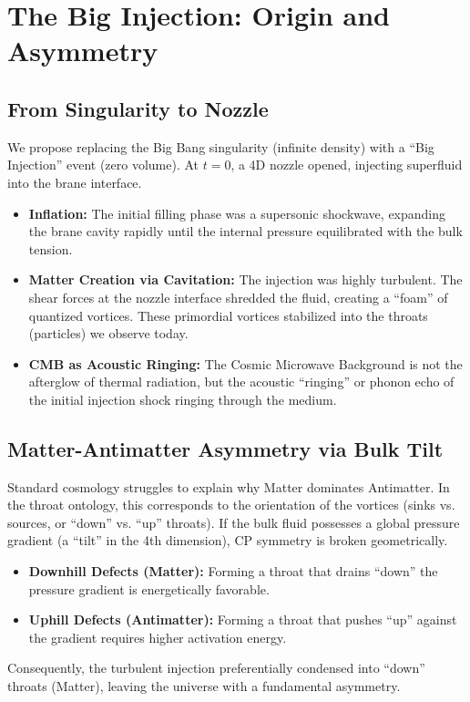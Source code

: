 \documentclass[12pt]{article}
\begin{document}
\section{The Big Injection: Origin and Asymmetry}
\label{sec:origin}

\subsection{From Singularity to Nozzle}
We propose replacing the Big Bang singularity (infinite density) with a ``Big Injection'' event (zero volume).
At $t=0$, a 4D nozzle opened, injecting superfluid into the brane interface.
\begin{itemize}
    \item \textbf{Inflation:} The initial filling phase was a supersonic shockwave, expanding the brane cavity rapidly until the internal pressure equilibrated with the bulk tension.
    \item \textbf{Matter Creation via Cavitation:} The injection was highly turbulent. The shear forces at the nozzle interface shredded the fluid, creating a ``foam'' of quantized vortices. These primordial vortices stabilized into the throats (particles) we observe today.
    \item \textbf{CMB as Acoustic Ringing:} The Cosmic Microwave Background is not the afterglow of thermal radiation, but the acoustic ``ringing'' or phonon echo of the initial injection shock ringing through the medium.
\end{itemize}

\subsection{Matter-Antimatter Asymmetry via Bulk Tilt}
Standard cosmology struggles to explain why Matter dominates Antimatter. In the throat ontology, this corresponds to the orientation of the vortices (sinks vs. sources, or ``down'' vs. ``up'' throats).
If the bulk fluid possesses a global pressure gradient (a ``tilt'' in the 4th dimension), CP symmetry is broken geometrically.
\begin{itemize}
    \item \textbf{Downhill Defects (Matter):} Forming a throat that drains ``down'' the pressure gradient is energetically favorable.
    \item \textbf{Uphill Defects (Antimatter):} Forming a throat that pushes ``up'' against the gradient requires higher activation energy.
\end{itemize}
Consequently, the turbulent injection preferentially condensed into ``down'' throats (Matter), leaving the universe with a fundamental asymmetry.
\end{document}
